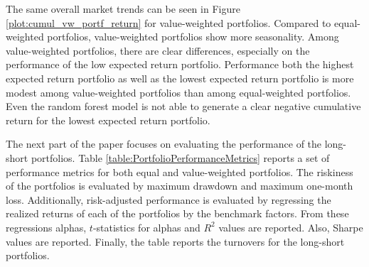 \documentclass[12pt]{article}
\begin{document}
The same overall market trends can be seen in Figure \ref{plot:cumul_vw_portf_return} for value-weighted portfolios. Compared to equal-weighted portfolios, value-weighted portfolios show more seasonality. Among value-weighted portfolios, there are clear differences, especially on the performance of the low expected return portfolio. Performance both the highest expected return portfolio as well as the lowest expected return portfolio is more modest among value-weighted portfolios than among equal-weighted portfolios. Even the random forest model is not able to generate a clear negative cumulative return for the lowest expected return portfolio. \par

The next part of the paper focuses on evaluating the performance of the long-short portfolios. Table \ref{table:PortfolioPerformanceMetrics} reports a set of performance metrics for both equal and value-weighted portfolios. The riskiness of the portfolios is evaluated by maximum drawdown and maximum one-month loss. Additionally, risk-adjusted performance is evaluated by regressing the realized returns of each of the portfolios by the benchmark factors. From these regressions alphas, $t$-statistics for alphas and $R^2$ values are reported. Also, Sharpe values are reported. Finally, the table reports the turnovers for the long-short portfolios. \par
\end{document}
